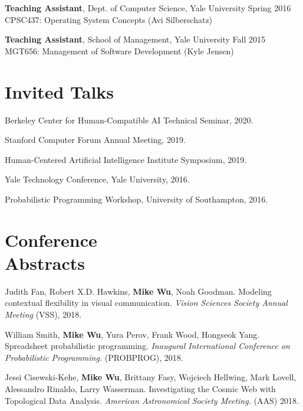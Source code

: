 \documentclass[margin, 10pt]{res} %
\begin{document}
\begin{resume}
\textbf{Teaching Assistant}, Dept. of Computer Science, Yale University \hfill Spring 2016\\
CPSC437: Operating System Concepts (Avi Silberschatz)

\textbf{Teaching Assistant}, School of Management, Yale University \hfill Fall 2015\\
MGT656: Management of Software Development (Kyle Jensen)


\section{Invited Talks}

Berkeley Center for Human-Compatible AI Technical Seminar, 2020.

Stanford Computer Forum Annual Meeting, 2019.

Human-Centered Artificial Intelligence Institute Symposium, 2019.

Yale Technology Conference, Yale University, 2016.

Probabilistic Programming Workshop, University of Southampton, 2016.

\section{Conference \\ Abstracts}

Judith Fan, Robert X.D. Hawkins, \textbf{Mike Wu}, Noah Goodman. Modeling contextual flexibility in visual communication. \textit{Vision Sciences Society Annual Meeting} (VSS), 2018.

William Smith, \textbf{Mike Wu}, Yura Perov, Frank Wood, Hongseok Yang. Spreadsheet probabilistic programming. \textit{Inaugural International Conference on Probabilistic Programming.} (PROBPROG), 2018.

Jessi Cisewski-Kehe, \textbf{Mike Wu}, Brittany Fasy, Wojciech Hellwing, Mark Lovell, Alessandro Rinaldo, Larry Wasserman. Investigating the Cosmic Web with Topological Data Analysis. \textit{American Astronomical Society Meeting.} (AAS) 2018.



\end{resume}
\end{document}
